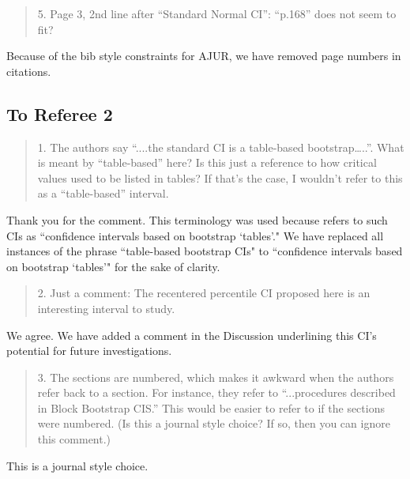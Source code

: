 \documentclass[12pt]{article}
\newenvironment{comment}%
{\begin{quotation}\noindent\small\it\color{darkblue}\ignorespaces%
}{\end{quotation}}
\begin{document}
\begin{comment}
5. Page 3, 2nd line after “Standard Normal CI”: “p.168” does not seem to fit?
\end{comment}

Because of the bib style constraints for AJUR, we have removed page numbers in 
citations.

\subsection*{To Referee 2}

\begin{comment}
1. The authors say “....the standard CI is a table-based bootstrap…..”.  
What is meant by “table-based” here?  Is this just a reference to how critical 
values used to be listed in tables?  If that’s the case, I wouldn’t refer to 
this as a “table-based” interval. 
\end{comment}

Thank you for the comment.  This terminology was used because 
\citet{efron1993introduction} refers to such CIs as 
``confidence intervals based on 
bootstrap `tables'." We have replaced all instances of the phrase 
``table-based bootstrap CIs" to ``confidence intervals based on bootstrap 
`tables'" for the sake of clarity.



\begin{comment}
2. Just a comment: The recentered percentile CI proposed here is an interesting 
interval to study. 
\end{comment}

We agree. We have added a comment in the Discussion underlining this CI's
potential for future investigations.

\begin{comment}
3. The sections are numbered, which makes it awkward when the authors refer back 
to a section.  For instance, they refer to “...procedures described in Block 
Bootstrap CIS.”  This would be easier to refer to if the sections were numbered.  
(Is this a journal style choice?  If so, then you can ignore this comment.)
\end{comment}

This is a journal style choice.
\end{document}
